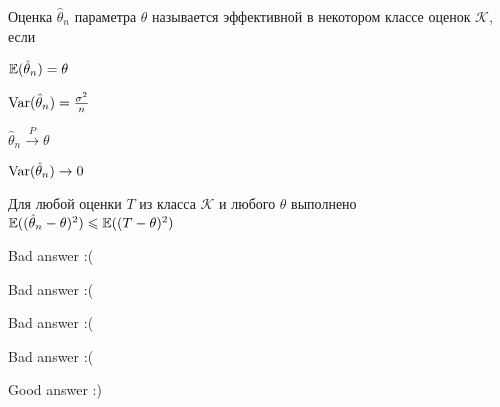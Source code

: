 
\begin{question}
Оценка \(\hat\theta_n\) параметра \(\theta\) называется эффективной в
некотором классе оценок \(\mathcal{K}\), если
\begin{answerlist}
  \item \(\operatorname{\mathbb{E}}(\hat\theta_n)=\theta\)
  \item \(\operatorname{Var}(\hat\theta_n)=\frac{\sigma^2}{n}\)
  \item \(\hat\theta_n \xrightarrow{P}\theta\)
  \item \(\operatorname{Var}(\hat\theta_n) \to 0\)
  \item Для любой оценки \(T\) из класса \(\mathcal{K}\) и любого \(\theta\)
выполнено \(\operatorname{\mathbb{E}}((\hat\theta_n-\theta)^2)\leqslant \operatorname{\mathbb{E}}((T-\theta)^2)\)
\end{answerlist}
\end{question}

\begin{solution}
\begin{answerlist}
  \item Bad answer :(
  \item Bad answer :(
  \item Bad answer :(
  \item Bad answer :(
  \item Good answer :)
\end{answerlist}
\end{solution}


